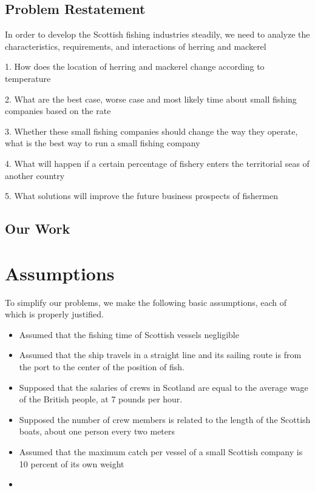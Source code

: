 \documentclass{mcmthesis}
\begin{document}

\subsection{Problem Restatement}
In order to develop the Scottish fishing industries steadily,   we need to analyze the characteristics, requirements, and interactions of herring and mackerel

1.    How does the location of herring and mackerel change according to temperature

2.    What are the best case, worse case and most likely time about  small fishing companies  based on the rate 


3.    Whether these small fishing companies should change the way they operate, what is the best way to run a small fishing company
 
4.    What will happen if a certain percentage of fishery enters the territorial seas of another country

5.    What solutions will improve the future business prospects of fishermen



\subsection{Our Work}


\section{Assumptions}
To simplify our problems, we make the following basic assumptions, each of which is properly justified.
\begin{itemize}
\item 
Assumed that the fishing time of Scottish vessels negligible
\item 
Assumed that the ship travels in a straight line and its sailing route is from the port to the center of the position of fish.
\item 
Supposed that the salaries of crews in Scotland are equal to the average wage of the British people, at 7 pounds per hour.
\item 
Supposed the number of crew members is related to the length of the Scottish boats, about one person every two meters
\item 
Assumed that the maximum catch per vessel of a small Scottish company is 10 percent of its own weight
\item 

\end{itemize}
\end{document}
